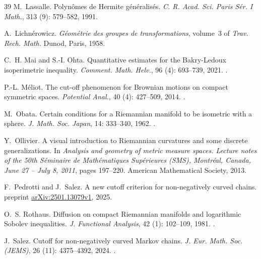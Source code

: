\documentclass[10pt,reqno]{amsart}
\numberwithin{equation}{section}
\begin{document}
\begin{thebibliography}{39}
M.~Lassalle.
\newblock Polyn\^omes de {H}ermite g\'en\'eralis\'es.
\newblock \emph{C. R. Acad. Sci. Paris S\'er. I Math.}, 313
  (9): 579--582, 1991.

A.~Lichn{\'e}rowicz.
\newblock \emph{G{\'e}om{\'e}trie des groupes de transformations}, volume~3 of
  \emph{Trav. Rech. Math.}
\newblock Dunod, Paris, 1958.

C.~H. Mai and S.-I. Ohta.
\newblock Quantitative estimates for the {Bakry}-{Ledoux} isoperimetric
  inequality.
\newblock \emph{Comment. Math. Helv.}, 96 (4): 693--739,
  2021.
\newblock {}.

P.-L. M{\'e}liot.
\newblock The cut-off phenomenon for {Brownian} motions on compact symmetric
  spaces.
\newblock \emph{Potential Anal.}, 40 (4): 427--509, 2014.
\newblock {}.

M.~Obata.
\newblock Certain conditions for a {Riemannian} manifold to be isometric with a
  sphere.
\newblock \emph{J. Math. Soc. Japan}, 14: 333--340, 1962.
\newblock {}.

Y.~Ollivier.
\newblock A visual introduction to {Riemannian} curvatures and some discrete
  generalizations.
\newblock In \emph{Analysis and geometry of metric measure spaces. Lecture
  notes of the 50th S\'eminaire de Math\'ematiques Sup\'erieures (SMS),
  Montr\'eal, Canada, June 27 -- July 8, 2011}, pages 197--220. American
  Mathematical Society, 2013.

F.~Pedrotti and J.~Salez.
\newblock A new cutoff criterion for non-negatively curved chains.
\newblock preprint
  \href{https://arXiv.org/abs/2501.13079v1}{arXiv:2501.13079v1}, 2025.

O.~S. Rothaus.
\newblock Diffusion on compact {R}iemannian manifolds and logarithmic {S}obolev
  inequalities.
\newblock \emph{J. Functional Analysis}, 42 (1): 102--109,
  1981.
\newblock {}.

J.~Salez.
\newblock Cutoff for non-negatively curved {Markov} chains.
\newblock \emph{J. Eur. Math. Soc. (JEMS)}, 26 (11):
  4375--4392, 2024.
\newblock {}.


\end{thebibliography}
\end{document}
